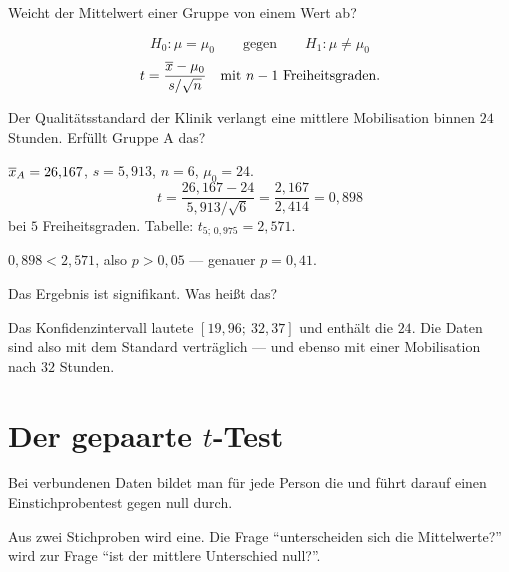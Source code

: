 \begin{merksatz}
Weicht der Mittelwert einer Gruppe von einem  Wert ab?

\[ H_0: \mu = \mu_0 \qquad\text{gegen}\qquad H_1: \mu \neq \mu_0 \]
\[ t = \frac{\overline{x} - \mu_0}{s/\sqrt n} \quad \text{mit } n-1 \text{ Freiheitsgraden} . \]

Der Qualitätsstandard der Klinik verlangt eine mittlere Mobilisation binnen $24$ Stunden. Erfüllt Gruppe A das?

$\overline{x}_A = 26{,}167$, $s = 5{,}913$, $n = 6$, $\mu_0 = 24$.
\[ t = \frac{26{,}167 - 24}{5{,}913/\sqrt6} = \frac{2{,}167}{2{,}414} = 0{,}898 \]
bei $5$ Freiheitsgraden. Tabelle: $t_{5;\,0{,}975} = 2{,}571$.

$0{,}898 < 2{,}571$, also $p > 0{,}05$ --- genauer $p = 0{,}41$.

Das Ergebnis ist  signifikant. Was heißt das?

Das Konfidenzintervall lautete $[19{,}96;\ 32{,}37]$ und enthält die $24$. Die Daten sind also mit dem Standard verträglich --- und ebenso mit einer Mobilisation nach $32$ Stunden.

\begin{center}
\begin{minipage}{0.88\textwidth}
\end{minipage}
\end{center}
\end{merksatz}

\section{Der gepaarte $t$-Test}

\begin{merksatz}
Bei verbundenen Daten bildet man für jede Person die  und führt darauf einen Einstichprobentest gegen null durch.

\begin{center}
\begin{minipage}{0.9\textwidth}
Aus zwei Stichproben wird eine. Die Frage \enquote{unterscheiden sich die Mittelwerte?} wird zur Frage \enquote{ist der mittlere Unterschied null?}.
\end{minipage}
\end{center}
\end{merksatz}


